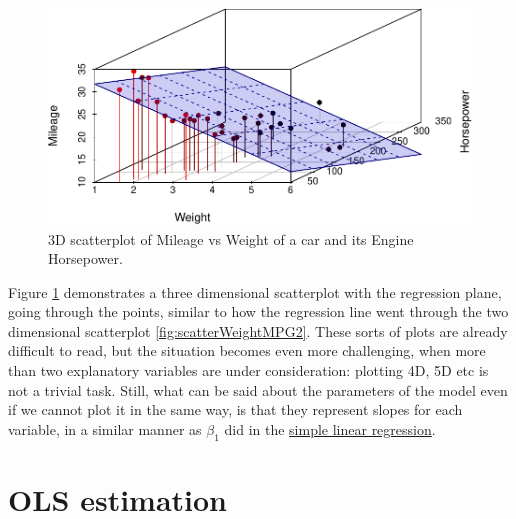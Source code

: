\documentclass[
]{book}
\theoremstyle{definition}
\theoremstyle{definition}
\theoremstyle{definition}
\theoremstyle{definition}
\theoremstyle{remark}
\begin{document}
\begin{figure}
\centering
\includegraphics{Svetunkov---Statistics-for-Business-Analytics_files/figure-latex/scatterplot3dmtcars-1.pdf}
\caption{\label{fig:scatterplot3dmtcars}3D scatterplot of Mileage vs Weight of a car and its Engine Horsepower.}
\end{figure}

Figure \ref{fig:scatterplot3dmtcars} demonstrates a three dimensional scatterplot with the regression plane, going through the points, similar to how the regression line went through the two dimensional scatterplot \ref{fig:scatterWeightMPG2}. These sorts of plots are already difficult to read, but the situation becomes even more challenging, when more than two explanatory variables are under consideration: plotting 4D, 5D etc is not a trivial task. Still, what can be said about the parameters of the model even if we cannot plot it in the same way, is that they represent slopes for each variable, in a similar manner as \(\beta_1\) did in the \protect\hyperlink{simpleLinearRegression}{simple linear regression}.

\hypertarget{ols-estimation}{%
\section{OLS estimation}\label{ols-estimation}}
\end{document}
